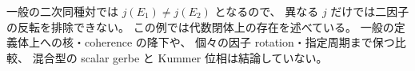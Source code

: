 \begin{example}[二次同種で生じる混合反転核]
一般の二次同種対では $j(E_1)\ne j(E_2)$ となるので、
異なる $j$ だけでは二因子の反転を排除できない。
この例では代数閉体上の存在を述べている。
一般の定義体上への核・coherence の降下や、
個々の因子 rotation・指定周期まで保つ比較、
混合型の scalar gerbe と Kummer 位相は結論していない。
\end{example}
